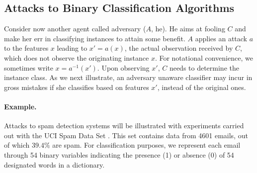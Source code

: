  

\subsection{Attacks to Binary Classification Algorithms} \label{sec:att_class}

Consider now another agent called adversary ($A$, he).
He aims at fooling $C$ and make her err in classifying instances to attain some benefit. 
$A$ applies an attack $a$ to the features $x$ leading to $x'=a(x)$, the actual observation received by $C$, which does 
not observe the originating instance $x$.
For notational convenience, we sometimes write $x=a^{-1} (x')$.
Upon observing $x'$, $C$ needs to determine the instance  class. 
As we next illustrate, an adversary unaware classifier
may incur in gross mistakes if she classifies based on features $x'$, instead of the original ones.

\paragraph{Example.} Attacks to spam detection systems will be illustrated with experiments carried out with the UCI Spam Data Set \parencite{spambase1999}.
This set contains data from 4601 emails, out of which $39.4 \%$ are spam. For classification purposes, we represent each email through 54 binary variables indicating the presence (1) or absence (0) of 54 designated words in a dictionary.

